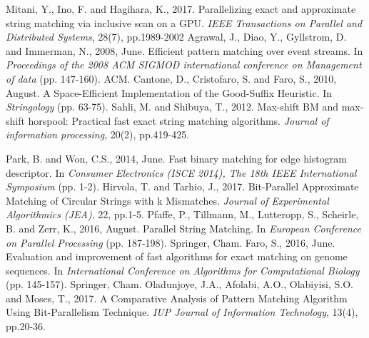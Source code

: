 %
%
% 
% 
%

\begin{thebibliography}{99.}%
%
%

 Mitani, Y., Ino, F. and Hagihara, K., 2017. Parallelizing exact and approximate string matching via inclusive scan on a GPU. \textit{IEEE Transactions on Parallel and Distributed Systems}, 28(7), pp.1989-2002 
 Agrawal, J., Diao, Y., Gyllstrom, D. and Immerman, N., 2008, June. Efficient pattern matching over event streams. In \textit{Proceedings of the 2008 ACM SIGMOD international conference on Management of data} (pp. 147-160). ACM.
%
 Cantone, D., Cristofaro, S. and Faro, S., 2010, August. A Space-Efficient Implementation of the Good-Suffix Heuristic. In \textit{Stringology} (pp. 63-75).
%
Sahli, M. and Shibuya, T., 2012. Max-shift BM and max-shift horspool: Practical fast exact string matching algorithms. \textit{Journal of information processing}, 20(2), pp.419-425.

Park, B. and Won, C.S., 2014, June. Fast binary matching for edge histogram descriptor. In \textit{Consumer Electronics (ISCE 2014), The 18th IEEE International Symposium} (pp. 1-2).
Hirvola, T. and Tarhio, J., 2017. Bit-Parallel Approximate Matching of Circular Strings with k Mismatches. \textit{Journal of Experimental Algorithmics (JEA)}, 22, pp.1-5.
Pfaffe, P., Tillmann, M., Lutteropp, S., Scheirle, B. and Zerr, K., 2016, August. Parallel String Matching. In \textit{European Conference on Parallel Processing} (pp. 187-198). Springer, Cham.
Faro, S., 2016, June. Evaluation and improvement of fast algorithms for exact matching on genome sequences. In \textit{International Conference on Algorithms for Computational Biology} (pp. 145-157). Springer, Cham.
Oladunjoye, J.A., Afolabi, A.O., Olabiyisi, S.O. and Moses, T., 2017. A Comparative Analysis of Pattern Matching Algorithm Using Bit-Parallelism Technique. \textit{IUP Journal of Information Technology}, 13(4), pp.20-36.


\end{thebibliography}
